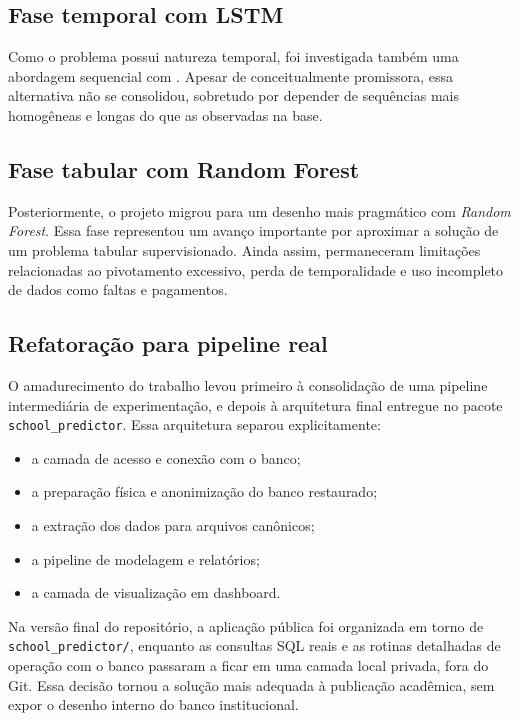 \subsection{Fase temporal com LSTM}

Como o problema possui natureza temporal, foi investigada tamb\'em uma abordagem sequencial com . Apesar de conceitualmente promissora, essa alternativa n\~ao se consolidou, sobretudo por depender de sequ\^encias mais homog\^eneas e longas do que as observadas na base.

\subsection{Fase tabular com Random Forest}

Posteriormente, o projeto migrou para um desenho mais pragm\'atico com \textit{Random Forest}. Essa fase representou um avan\c{c}o importante por aproximar a solu\c{c}\~ao de um problema tabular supervisionado. Ainda assim, permaneceram limita\c{c}\~oes relacionadas ao pivotamento excessivo, perda de temporalidade e uso incompleto de dados como faltas e pagamentos.

\subsection{Refatora\c{c}\~ao para pipeline real}

O amadurecimento do trabalho levou primeiro \`a consolida\c{c}\~ao de uma pipeline intermedi\'aria de experimenta\c{c}\~ao, e depois \`a arquitetura final entregue no pacote \texttt{school\_predictor}. Essa arquitetura separou explicitamente:

\begin{itemize}
    \item a camada de acesso e conex\~ao com o banco;
    \item a prepara\c{c}\~ao f\'isica e anonimiza\c{c}\~ao do banco restaurado;
    \item a extra\c{c}\~ao dos dados para arquivos can\^onicos;
    \item a pipeline de modelagem e relat\'orios;
    \item a camada de visualiza\c{c}\~ao em dashboard.
\end{itemize}

Na vers\~ao final do reposit\'orio, a aplica\c{c}\~ao p\'ublica foi organizada em torno de \texttt{school\_predictor/}, enquanto as consultas SQL reais e as rotinas detalhadas de opera\c{c}\~ao com o banco passaram a ficar em uma camada local privada, fora do Git. Essa decis\~ao tornou a solu\c{c}\~ao mais adequada \`a publica\c{c}\~ao acad\^emica, sem expor o desenho interno do banco institucional.

